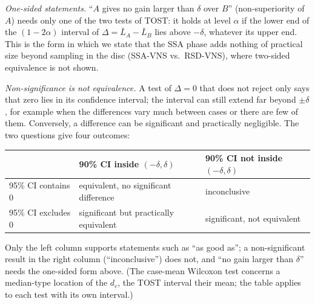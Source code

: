 \emph{One-sided statements.} ``$A$ gives no gain larger than $\delta$ over $B$'' (non-superiority of $A$) needs only one of the two tests of TOST: it holds at level $\alpha$ if the lower end of the $(1-2\alpha)$ interval of $\Delta=\bar L_A-\bar L_B$ lies above $-\delta$, whatever its upper end. This is the form in which we state that the SSA phase adds nothing of practical size beyond sampling in the disc (SSA-VNS vs.\ RSD-VNS), where two-sided equivalence is not shown.

\emph{Non-significance is not equivalence.} A test of $\Delta=0$ that does not reject only says that zero lies in its confidence interval; the interval can still extend far beyond $\pm\delta$, for example when the differences vary much between cases or there are few of them. Conversely, a difference can be significant and practically negligible. The two questions give four outcomes:

\begin{center}
\small
\begin{tabular}{lll}
\toprule
& 90\% CI inside $(-\delta,\delta)$ & 90\% CI not inside $(-\delta,\delta)$\\
\midrule
95\% CI contains 0 & equivalent, no significant difference & inconclusive\\
95\% CI excludes 0 & significant but practically equivalent & significant, not equivalent\\
\bottomrule
\end{tabular}
\end{center}
Only the left column supports statements such as ``as good as''; a non-significant result in the right column (``inconclusive'') does not, and ``no gain larger than $\delta$'' needs the one-sided form above. (The case-mean Wilcoxon test concerns a median-type location of the $d_c$, the TOST interval their mean; the table applies to each test with its own interval.)

